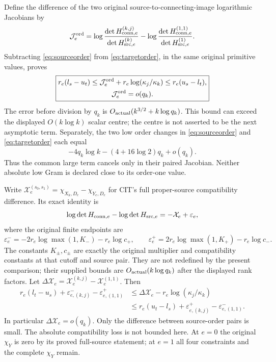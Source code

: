 \documentclass[11pt,a4paper]{article}
\begin{document}
Define the difference of the two original source-to-connecting-image logarithmic Jacobians by
\[
 \mathcal J_e^{\rm ord}=
 \log\frac{\det H_{{\rm conn},e}^{(k,j)}}{\det H_{{\rm src},e}^{(k)}}
 -\log\frac{\det H_{{\rm conn},e}^{(1,1)}}{\det H_{{\rm src},e}^{(1)}}.
\]
Subtracting \eqref{eq:sourceorder} from \eqref{eq:targetorder}, in the same original primitive values, proves
\begin{equation}
\boxed{\begin{gathered}
 r_e(l_s-u_t)\le
 \mathcal J_e^{\rm ord}+r_e\log(\kappa_j/\kappa_k)
 \le r_e(u_s-l_t),\\
 \mathcal J_e^{\rm ord}=o(q_k).
\end{gathered}}
\label{eq:paired}
\end{equation}
The error before division by $q_k$ is $O_{\rm actual}(k^{3/2}+k\log q_k)$. This bound can exceed the displayed $O(k\log k)$ scalar centre; the centre is not asserted to be the next asymptotic term. Separately, the two low order changes in \eqref{eq:sourceorder} and \eqref{eq:targetorder} each equal
\begin{equation}
 -4q_k\log k-(4+16\log2)q_k+o(q_k).
 \label{eq:lowdual}
\end{equation}
Thus the common large term cancels only in their paired Jacobian. Neither absolute low Gram is declared close to its order-one value.

Write $\mathcal X_e^{(s_0,s_1)}=\chi_{X_k,D_e}-\chi_{Y_e,D_e}$ for CIT's full proper-source compatibility difference. Its exact identity is
\[
 \log\det H_{{\rm conn},e}-\log\det H_{{\rm src},e}
 =-\mathcal X_e+\varepsilon_e,
\]
where the original finite endpoints are
\[
 \varepsilon_e^-=-2r_e\log\max(1,K_-)-r_e\log c_+,
 \qquad
 \varepsilon_e^+=2r_e\log\max(1,K_+)-r_e\log c_-.
\]
The constants $K_\pm,c_\pm$ are exactly the original multiplier and compatibility constants at that cutoff and source pair. They are not redefined by the present comparison; their supplied bounds are $O_{\rm actual}(k\log q_k)$ after the displayed rank factors.
Let $\Delta\mathcal X_e=\mathcal X_e^{(k,j)}-\mathcal X_e^{(1,1)}$. Then
\begin{equation}
\begin{split}
 r_e(l_t-u_s)+\varepsilon_{e,(k,j)}^-
                  -\varepsilon_{e,(1,1)}^+
 &\le\Delta\mathcal X_e-r_e\log(\kappa_j/\kappa_k)\\
 &\le r_e(u_t-l_s)+\varepsilon_{e,(k,j)}^+
                  -\varepsilon_{e,(1,1)}^- .
\end{split}\label{eq:chi}
\end{equation}
In particular $\Delta\mathcal X_e=o(q_k)$. Only the difference between source-order pairs is small. The absolute compatibility loss is not bounded here. At $e=0$ the original $\chi_Y$ is zero by its proved full-source statement; at $e=1$ all four constraints and the complete $\chi_Y$ remain.
\end{document}
